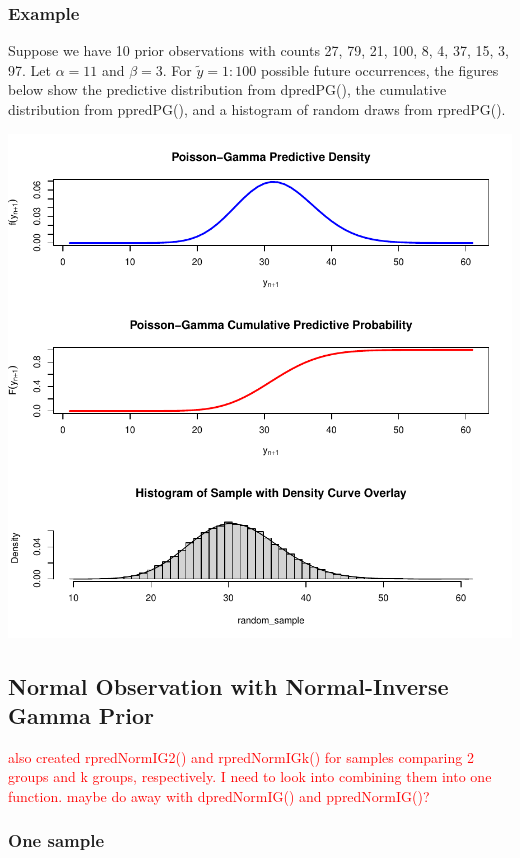 \documentclass[12pt, a4paper]{article}
\begin{document}
    \subsubsection{Example}

Suppose we have 10 prior observations with counts 27, 79, 21, 100, 8, 4, 37, 15, 3, 97.  Let $\alpha = 11$ and $\beta = 3$.  For $\tilde{y} = 1:100$ possible future occurrences, the figures below show the predictive distribution from dpredPG(), the cumulative distribution from ppredPG(), and a histogram of random draws from rpredPG().

\includegraphics{Thesis-005}

\clearpage

  \subsection{Normal Observation with Normal-Inverse Gamma Prior}

    \textcolor{red}{also created rpredNormIG2() and rpredNormIGk() for samples comparing 2 groups and k groups, respectively.  I need to look into combining them into one function.  maybe do away with dpredNormIG() and ppredNormIG()?}
    \subsubsection{One sample}
\end{document}
